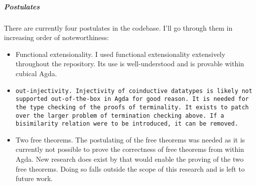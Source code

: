 \subparagraph{Postulates}
There are currently four postulates in the codebase.
I'll go through them in increasing order of noteworthiness:
\begin{itemize}[noitemsep]
  \item Functional extensionality.
  I used functional extensionality extensively throughout the repository.
  Its use is well-understood and is provable within cubical Agda.
  \item \tt{out}-injectivity.
  Injectivity of coinductive datatypes is likely not supported out-of-the-box in Agda for good reason.
  It is needed for the type checking of the proofs of terminality.
  It exists to patch over the larger problem of termination checking above.
  If a bisimilarity relation were to be introduced, it can be removed.
  \item Two free theorems.
  The postulating of the free theorems was needed as it is currently not possible to prove the correctness of free theorems from within Agda.
  New research does exist by \cite{Muylder2024} that would enable the proving of the two free theorems.
  Doing so falls outside the scope of this research and is left to future work.
\end{itemize}

